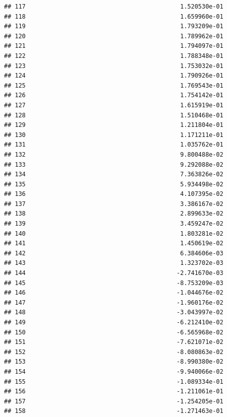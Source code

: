 \documentclass[
]{article}
\begin{document}
\begin{verbatim}
## 117                                           1.520530e-01
## 118                                           1.659960e-01
## 119                                           1.793209e-01
## 120                                           1.789962e-01
## 121                                           1.794097e-01
## 122                                           1.788348e-01
## 123                                           1.753032e-01
## 124                                           1.790926e-01
## 125                                           1.769543e-01
## 126                                           1.754142e-01
## 127                                           1.615919e-01
## 128                                           1.510468e-01
## 129                                           1.211804e-01
## 130                                           1.171211e-01
## 131                                           1.035762e-01
## 132                                           9.800488e-02
## 133                                           9.292088e-02
## 134                                           7.363826e-02
## 135                                           5.934498e-02
## 136                                           4.107395e-02
## 137                                           3.386167e-02
## 138                                           2.899633e-02
## 139                                           3.459247e-02
## 140                                           1.803281e-02
## 141                                           1.450619e-02
## 142                                           6.384606e-03
## 143                                           1.323702e-03
## 144                                          -2.741670e-03
## 145                                          -8.753209e-03
## 146                                          -1.044676e-02
## 147                                          -1.960176e-02
## 148                                          -3.043997e-02
## 149                                          -6.212410e-02
## 150                                          -6.565968e-02
## 151                                          -7.621071e-02
## 152                                          -8.080863e-02
## 153                                          -8.990380e-02
## 154                                          -9.940066e-02
## 155                                          -1.089334e-01
## 156                                          -1.211061e-01
## 157                                          -1.254205e-01
## 158                                          -1.271463e-01

\end{verbatim}
\end{document}
